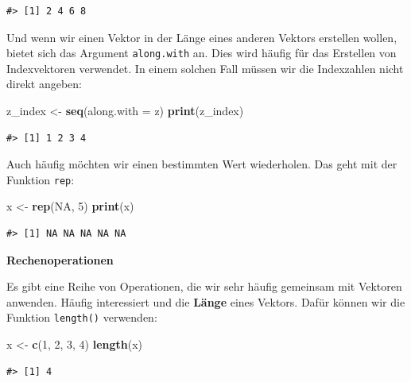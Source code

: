 \documentclass[]{tufte-book}
\newenvironment{Shaded}{}{}
\newcommand{\KeywordTok}[1]{\textcolor[rgb]{0.00,0.44,0.13}{\textbf{#1}}}
\newcommand{\DataTypeTok}[1]{\textcolor[rgb]{0.56,0.13,0.00}{#1}}
\newcommand{\DecValTok}[1]{\textcolor[rgb]{0.25,0.63,0.44}{#1}}
\newcommand{\StringTok}[1]{\textcolor[rgb]{0.25,0.44,0.63}{#1}}
\newcommand{\OtherTok}[1]{\textcolor[rgb]{0.00,0.44,0.13}{#1}}
\newcommand{\NormalTok}[1]{#1}
\begin{document}
\begin{verbatim}
#> [1] 2 4 6 8
\end{verbatim}

Und wenn wir einen Vektor in der Länge eines anderen Vektors erstellen
wollen, bietet sich das Argument \texttt{along.with} an. Dies wird
häufig für das Erstellen von Indexvektoren verwendet. In einem solchen
Fall müssen wir die Indexzahlen nicht direkt angeben:

\begin{Shaded}
\begin{Highlighting}[]
\NormalTok{z_index <-}\StringTok{ }\KeywordTok{seq}\NormalTok{(}\DataTypeTok{along.with =}\NormalTok{ z)}
\KeywordTok{print}\NormalTok{(z_index)}
\end{Highlighting}
\end{Shaded}

\begin{verbatim}
#> [1] 1 2 3 4
\end{verbatim}

Auch häufig möchten wir einen bestimmten Wert wiederholen. Das geht mit
der Funktion \texttt{rep}:

\begin{Shaded}
\begin{Highlighting}[]
\NormalTok{x <-}\StringTok{ }\KeywordTok{rep}\NormalTok{(}\OtherTok{NA}\NormalTok{, }\DecValTok{5}\NormalTok{)}
\KeywordTok{print}\NormalTok{(x)}
\end{Highlighting}
\end{Shaded}

\begin{verbatim}
#> [1] NA NA NA NA NA
\end{verbatim}

\textbf{Rechenoperationen}

Es gibt eine Reihe von Operationen, die wir sehr häufig gemeinsam mit
Vektoren anwenden. Häufig interessiert und die \textbf{Länge} eines
Vektors. Dafür können wir die Funktion \texttt{length()} verwenden:

\begin{Shaded}
\begin{Highlighting}[]
\NormalTok{x <-}\StringTok{ }\KeywordTok{c}\NormalTok{(}\DecValTok{1}\NormalTok{, }\DecValTok{2}\NormalTok{, }\DecValTok{3}\NormalTok{, }\DecValTok{4}\NormalTok{)}
\KeywordTok{length}\NormalTok{(x)}
\end{Highlighting}
\end{Shaded}

\begin{verbatim}
#> [1] 4
\end{verbatim}
\end{document}
